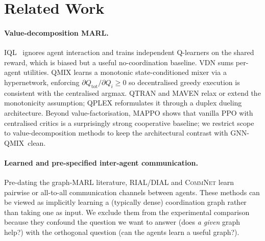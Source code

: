 \documentclass[10pt]{article}
\newcommand{\algoname}[1]{\textsc{#1}}
\newcommand{\iql}{\algoname{IQL}}
\newcommand{\vdn}{\algoname{VDN}}
\newcommand{\qmix}{\algoname{QMIX}}
\newcommand{\gnnqmix}{\algoname{GNN-QMIX}}
\newcommand{\Qtot}{Q_{\mathrm{tot}}}
\newcommand{\Qi}{Q_i}
\begin{document}
\section{Related Work}
\label{sec:related}

\paragraph{Value-decomposition MARL.} \iql~\citep{tan_1993_marl} ignores
agent interaction and trains independent Q-learners on the shared reward,
which is biased but a useful no-coordination baseline. \vdn
\citep{sunehag_2018_vdn} sums per-agent utilities. \qmix
\citep{rashid_2018_qmix,rashid_2020_qmix_jmlr} learns a monotonic state-conditioned
mixer via a hypernetwork, enforcing $\partial \Qtot / \partial \Qi \geq 0$
so decentralised greedy execution is consistent with the centralised
argmax. \algoname{QTRAN} \citep{son_2019_qtran} and \algoname{MAVEN}
\citep{mahajan_2019_maven} relax or extend the monotonicity assumption;
\algoname{QPLEX} \citep{wang_2021_qplex} reformulates it through a
duplex dueling architecture. Beyond value-factorisation,
\algoname{MAPPO} \citep{yu_2022_mappo} shows that vanilla PPO with
centralised critics is a surprisingly strong cooperative baseline; we
restrict scope to value-decomposition methods to keep the architectural
contrast with \gnnqmix\ clean.

\paragraph{Learned and pre-specified inter-agent communication.}
Pre-dating the graph-MARL literature, \algoname{RIAL/DIAL}
\citep{foerster_2016_rial_dial} and \algoname{CommNet}
\citep{sukhbaatar_2016_commnet} learn pairwise or all-to-all
communication channels between agents. These methods can be viewed as
implicitly learning a (typically dense) coordination graph rather than
taking one as input. We exclude them from the experimental comparison
because they confound the question we want to answer (does \emph{a given}
graph help?) with the orthogonal question (can the agents learn a useful
graph?).
\end{document}
